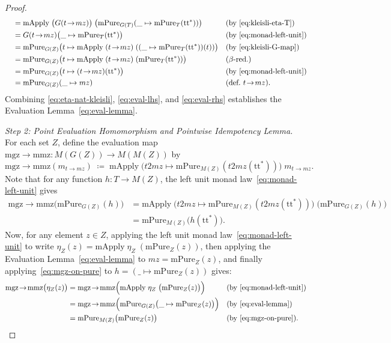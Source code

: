 \documentclass[11pt,a4paper]{article}
\theoremstyle{definition}
\theoremstyle{remark}
\newcommand{\ttstar}{\mathrm{tt}^*}
\begin{document}
\begin{proof}
\begin{align}
  &\quad= \mathrm{mApply}\;\bigl(G(t\!\to\!mz)\bigr)\;\bigl(\mathrm{mPure}_{G(T)}(\_ \mapsto \mathrm{mPure}_T(\ttstar))\bigr)
    &&\text{(by \eqref{eq:kleisli-eta-T})} \nonumber \\
  &\quad= G(t\!\to\!mz)\bigl(\_ \mapsto \mathrm{mPure}_T(\ttstar)\bigr)
    &&\text{(by \eqref{eq:monad-left-unit})} \nonumber \\
  &\quad= \mathrm{mPure}_{G(Z)}\bigl(t \mapsto \mathrm{mApply}\;(t\!\to\!mz)\;((\_ \mapsto \mathrm{mPure}_T(\ttstar))(t))\bigr)
    &&\text{(by \eqref{eq:kleisli-G-map})} \nonumber \\
  &\quad= \mathrm{mPure}_{G(Z)}\bigl(t \mapsto \mathrm{mApply}\;(t\!\to\!mz)\;(\mathrm{mPure}_T(\ttstar))\bigr)
    &&\text{($\beta$-red.)} \nonumber \\
  &\quad= \mathrm{mPure}_{G(Z)}\bigl(t \mapsto (t\!\to\!mz)(\ttstar)\bigr)
    &&\text{(by \eqref{eq:monad-left-unit})} \nonumber \\
  &\quad= \mathrm{mPure}_{G(Z)}(\_ \mapsto mz)
    &&\text{(def.\ $t\!\to\!mz$)}. \label{eq:eval-rhs}
\end{align}
Combining \eqref{eq:eta-nat-kleisli}, \eqref{eq:eval-lhs}, and \eqref{eq:eval-rhs} establishes the
Evaluation Lemma~\eqref{eq:eval-lemma}.

\emph{Step 2: Point Evaluation Homomorphism and Pointwise Idempotency Lemma.}
For each set $Z$, define the evaluation map $\mathrm{mgz\!\to\!mmz} : M(G(Z)) \to M(M(Z))$ by
\begin{equation}\label{eq:mgz-to-mmz}
  \mathrm{mgz\!\to\!mmz}(m_{t\to mz})
  \;\coloneqq\; \mathrm{mApply}\;\bigl(t2mz \mapsto \mathrm{mPure}_{M(Z)}(t2mz(\ttstar))\bigr)\;m_{t\to mz}.
\end{equation}
Note that for any function $h : T \to M(Z)$, the left unit monad law~\eqref{eq:monad-left-unit} gives
\begin{align}
  \mathrm{mgz\!\to\!mmz}\bigl(\mathrm{mPure}_{G(Z)}(h)\bigr)
  &= \mathrm{mApply}\;\bigl(t2mz \mapsto \mathrm{mPure}_{M(Z)}(t2mz(\ttstar))\bigr)\;\bigl(\mathrm{mPure}_{G(Z)}(h)\bigr) \nonumber \\
  &= \mathrm{mPure}_{M(Z)}\bigl(h(\ttstar)\bigr). \label{eq:mgz-on-pure}
\end{align}
Now, for any element $z \in Z$, applying the left unit monad law~\eqref{eq:monad-left-unit} to write
$\eta_Z(z) = \mathrm{mApply}\;\eta_Z\;(\mathrm{mPure}_Z(z))$, then applying the Evaluation
Lemma~\eqref{eq:eval-lemma} to $mz = \mathrm{mPure}_Z(z)$, and finally applying~\eqref{eq:mgz-on-pure}
to $h = (\_ \mapsto \mathrm{mPure}_Z(z))$ gives:
\begin{align}
  \mathrm{mgz\!\to\!mmz}\bigl(\eta_Z(z)\bigr)
  &= \mathrm{mgz\!\to\!mmz}\Bigl(\mathrm{mApply}\;\eta_Z\;\bigl(\mathrm{mPure}_Z(z)\bigr)\Bigr)
    &&\text{(by \eqref{eq:monad-left-unit})} \nonumber \\
  &= \mathrm{mgz\!\to\!mmz}\Bigl(\mathrm{mPure}_{G(Z)}\bigl(\_ \mapsto \mathrm{mPure}_Z(z)\bigr)\Bigr)
    &&\text{(by \eqref{eq:eval-lemma})} \nonumber \\
  &= \mathrm{mPure}_{M(Z)}\bigl(\mathrm{mPure}_Z(z)\bigr)
    &&\text{(by \eqref{eq:mgz-on-pure})}. \label{eq:idempotent-lemma}
\end{align}


\end{proof}
\end{document}

